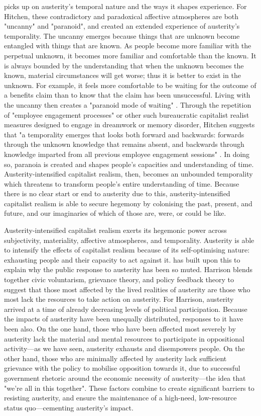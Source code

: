 \citet{hitchen_affective_2019} picks up on austerity's temporal nature and the ways it shapes experience. For Hitchen, these contradictory and paradoxical affective atmospheres are both "uncanny" and "paranoid", and created an extended experience of austerity's temporality. The uncanny emerges because things that are unknown become entangled with things that are known. As people become more familiar with the perpetual unknown, it becomes more familiar and comfortable than the known. It is always bounded by the understanding that when the unknown becomes the known, material circumstances will get worse; thus it is better to exist in the unknown. For example, it feels more comfortable to be waiting for the outcome of a benefits claim than to know that the claim has been unsuccessful. Living with the uncanny then  creates a "paranoid mode of waiting" \citep[p. 13]{hitchen_affective_2019}. Through the repetition of "employee engagement processes" or other such bureaucratic capitalist realist measures designed to engage in dreamwork or memory disorder, Hitchen suggests that "a temporality emerges that looks both forward and backwards: forwards through the unknown knowledge that remains absent, and backwards through knowledge imparted from all previous employee engagement sessions" \citep[p. 12]{hitchen_affective_2019}. In doing so, paranoia is created and shapes people's capacities and understanding of time. Austerity-intensified capitalist realism, then, becomes an unbounded temporality which threatens to transform people's entire understanding of time. Because there is no clear start or end to austerity due to this, austerity-intensified capitalist realism is able to secure hegemony by colonising the past, present, and future, and our imaginaries of which of those are, were, or could be like.

Austerity-intensified capitalist realism exerts its hegemonic power across subjectivity, materiality, affective atmospheres, and temporality. Austerity is able to intensify the effects of capitalist realism because of its self-optimising nature: exhausting people and their capacity to act against it. \citet{harrison_cant_2020} has built upon this to explain why the public response to austerity has been so muted. Harrison blends together civic voluntarism, grievance theory, and policy feedback theory to suggest that those most affected by the lived realities of austerity are those who most lack the resources to take action on austerity. For Harrison, austerity arrived at a time of already decreasing levels of political participation. Because the impacts of austerity have been unequally distributed, responses to it have been also. On the one hand, those who have been affected most severely by austerity lack the material and mental resources to participate in oppositional activity—as we have seen, austerity exhausts and disempowers people. On the other hand, those who are minimally affected by austerity lack sufficient grievance with the policy to mobilise opposition towards it, due to successful government rhetoric around the economic necessity of austerity—the idea that "we're all in this together". These factors combine to create significant barriers to resisting austerity, and ensure the maintenance of a high-need, low-resource status quo—cementing austerity's impact.

